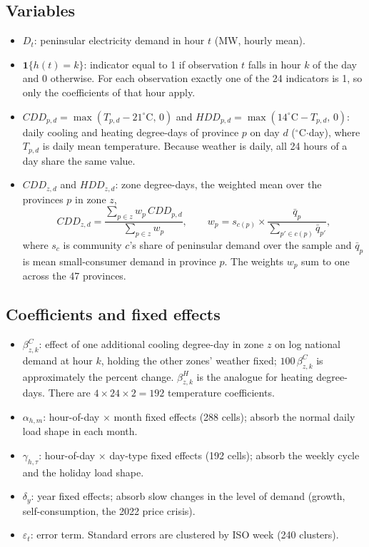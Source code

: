 \documentclass[11pt]{article}
\begin{document}
\subsection*{Variables}
\begin{itemize}
  \item $D_t$: peninsular electricity demand in hour $t$ (MW, hourly mean).
  \item $\mathbf{1}\{h(t)=k\}$: indicator equal to 1 if observation $t$ falls in
        hour $k$ of the day and 0 otherwise. For each observation exactly one of
        the 24 indicators is 1, so only the coefficients of that hour apply.
  \item $CDD_{p,d} = \max(T_{p,d} - 21^{\circ}\mathrm{C},\, 0)$ and
        $HDD_{p,d} = \max(14^{\circ}\mathrm{C} - T_{p,d},\, 0)$: daily cooling and
        heating degree-days of province $p$ on day $d$ ($^{\circ}$C$\cdot$day),
        where $T_{p,d}$ is daily mean temperature. Because weather is daily, all
        24 hours of a day share the same value.
  \item $CDD_{z,d}$ and $HDD_{z,d}$: zone degree-days, the weighted mean over the
        provinces $p$ in zone $z$,
        \[
          CDD_{z,d} = \frac{\sum_{p \in z} w_p\, CDD_{p,d}}{\sum_{p \in z} w_p},
          \qquad
          w_p = s_{c(p)} \times \frac{\bar{q}_p}{\sum_{p' \in c(p)} \bar{q}_{p'}},
        \]
        where $s_{c}$ is community $c$'s share of peninsular demand over the
        sample and $\bar{q}_p$ is mean small-consumer demand in province $p$.
        The weights $w_p$ sum to one across the 47 provinces.
\end{itemize}

\subsection*{Coefficients and fixed effects}
\begin{itemize}
  \item $\beta^{C}_{z,k}$: effect of one additional cooling degree-day in zone $z$
        on log national demand at hour $k$, holding the other zones' weather
        fixed; $100\,\beta^{C}_{z,k}$ is approximately the percent change.
        $\beta^{H}_{z,k}$ is the analogue for heating degree-days. There are
        $4 \times 24 \times 2 = 192$ temperature coefficients.
  \item $\alpha_{h,m}$: hour-of-day $\times$ month fixed effects (288 cells);
        absorb the normal daily load shape in each month.
  \item $\gamma_{h,\tau}$: hour-of-day $\times$ day-type fixed effects (192 cells);
        absorb the weekly cycle and the holiday load shape.
  \item $\delta_{y}$: year fixed effects; absorb slow changes in the level of
        demand (growth, self-consumption, the 2022 price crisis).
  \item $\varepsilon_t$: error term. Standard errors are clustered by ISO week
        (240 clusters).
\end{itemize}
\end{document}
